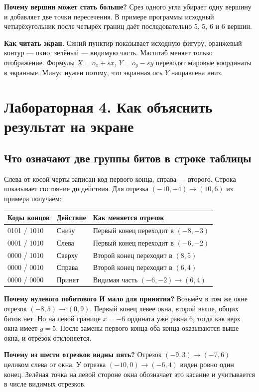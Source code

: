 \documentclass[11pt,a4paper]{extarticle}
\begin{document}
\textbf{Почему вершин может стать больше?} Срез одного угла убирает одну вершину и добавляет две точки пересечения. В примере программы исходный четырёхугольник после четырёх границ даёт последовательно 5, 5, 6 и 6 вершин.

\textbf{Как читать экран.} Синий пунктир показывает исходную фигуру, оранжевый контур --- окно, зелёный --- видимую часть. Масштаб меняет только отображение. Формулы $X=o_x+sx$, $Y=o_y-sy$ переводят мировые координаты в экранные. Минус нужен потому, что экранная ось $Y$ направлена вниз.

\clearpage
\section*{Лабораторная 4. Как объяснить результат на экране}
\subsection*{Что означают две группы битов в строке таблицы}
Слева от косой черты записан код первого конца, справа --- второго. Строка показывает состояние \textbf{до} действия. Для отрезка $(-10,-4)\to(10,6)$ из примера получаем:
\begin{center}\begin{tabular}{lll}\toprule
Коды концов & Действие & Как меняется отрезок\\\midrule
0101 / 1010 & Снизу & Первый конец переходит в $(-8,-3)$\\
0001 / 1010 & Слева & Первый конец переходит в $(-6,-2)$\\
0000 / 1010 & Сверху & Второй конец переходит в $(8,5)$\\
0000 / 0010 & Справа & Второй конец переходит в $(6,4)$\\
0000 / 0000 & Принят & Видимая часть $(-6,-2)\to(6,4)$\\\bottomrule\end{tabular}\end{center}
\textbf{Почему нулевого побитового И мало для принятия?} Возьмём в том же окне отрезок $(-8,5)\to(0,9)$. Первый конец левее окна, второй выше, общих битов нет. Но на левой границе $x=-6$ ордината уже равна 6, тогда как верх окна имеет $y=5$. После замены первого конца оба конца оказываются выше окна, и отрезок отклоняется.

\textbf{Почему из шести отрезков видны пять?} Отрезок $(-9,3)\to(-7,6)$ целиком слева от окна. У отрезка $(-10,0)\to(-6,4)$ виден ровно один конец. Зелёная точка на левой стороне окна обозначает это касание и учитывается в числе видимых отрезков.
\end{document}
